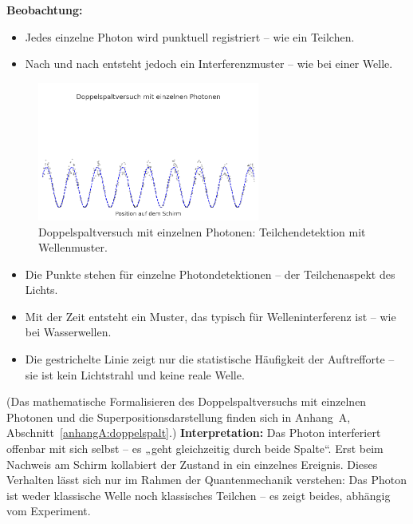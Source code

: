 \textbf{Beobachtung:}
\begin{itemize}
	\item Jedes einzelne Photon wird punktuell registriert – wie ein Teilchen.
	\item Nach und nach entsteht jedoch ein Interferenzmuster – wie bei einer Welle.
\end{itemize}

\vspace{1em}
\begin{figure}[H]
	\begin{center}
		\includegraphics[width=0.65\textwidth]{bilder/doppelspalt-photonen.png}
	\end{center}
	\caption{Doppelspaltversuch mit einzelnen Photonen: Teilchendetektion mit Wellenmuster.}
\end{figure}

\begin{tcolorbox}[physikbox, title=Was die Photonengrafik zeigen soll]
	\label{box:was die photonengrafik}
	\small
	\begin{itemize}
		\item Die Punkte stehen für einzelne Photondetektionen – der Teilchenaspekt des Lichts.
		\item Mit der Zeit entsteht ein Muster, das typisch für Welleninterferenz ist – wie bei Wasserwellen.
		\item Die gestrichelte Linie zeigt nur die statistische Häufigkeit der Auftrefforte – sie ist kein Lichtstrahl und keine reale Welle.
	\end{itemize}
\end{tcolorbox}
\vspace{1em}
(Das mathematische Formalisieren des Doppelspaltversuchs mit einzelnen Photonen und die Superpositionsdarstellung finden sich in Anhang~A, Abschnitt~\ref{anhangA:doppelspalt}.) %
\textbf{Interpretation:}  
Das Photon interferiert offenbar mit sich selbst – es „geht gleichzeitig durch beide Spalte“. Erst beim Nachweis am Schirm kollabiert der Zustand in ein einzelnes Ereignis. Dieses Verhalten lässt sich nur im Rahmen der Quantenmechanik verstehen: Das Photon ist weder klassische Welle noch klassisches Teilchen – es zeigt beides, abhängig vom Experiment.

